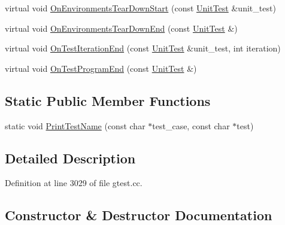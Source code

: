 \begin{DoxyCompactItemize}
\item 
virtual void \hyperlink{classtesting_1_1internal_1_1_pretty_unit_test_result_printer_afea9dc849c92fdbc1d8505f4c74ffc1a}{On\+Environments\+Tear\+Down\+Start} (const \hyperlink{classtesting_1_1_unit_test}{Unit\+Test} \&unit\+\_\+test)
\item 
virtual void \hyperlink{classtesting_1_1internal_1_1_pretty_unit_test_result_printer_ab23094ef3b714778b2f742d39818c280}{On\+Environments\+Tear\+Down\+End} (const \hyperlink{classtesting_1_1_unit_test}{Unit\+Test} \&)
\item 
virtual void \hyperlink{classtesting_1_1internal_1_1_pretty_unit_test_result_printer_ac29b30216023baddda04ef5889f484ff}{On\+Test\+Iteration\+End} (const \hyperlink{classtesting_1_1_unit_test}{Unit\+Test} \&unit\+\_\+test, int iteration)
\item 
virtual void \hyperlink{classtesting_1_1internal_1_1_pretty_unit_test_result_printer_a8c92c062889abdb940b04ffe113f5980}{On\+Test\+Program\+End} (const \hyperlink{classtesting_1_1_unit_test}{Unit\+Test} \&)
\end{DoxyCompactItemize}
\subsection*{Static Public Member Functions}
\begin{DoxyCompactItemize}
\item 
static void \hyperlink{classtesting_1_1internal_1_1_pretty_unit_test_result_printer_a5b60a9aed1db02837b11450f6e8d0f71}{Print\+Test\+Name} (const char $\ast$test\+\_\+case, const char $\ast$test)
\end{DoxyCompactItemize}


\subsection{Detailed Description}


Definition at line 3029 of file gtest.\+cc.



\subsection{Constructor \& Destructor Documentation}
